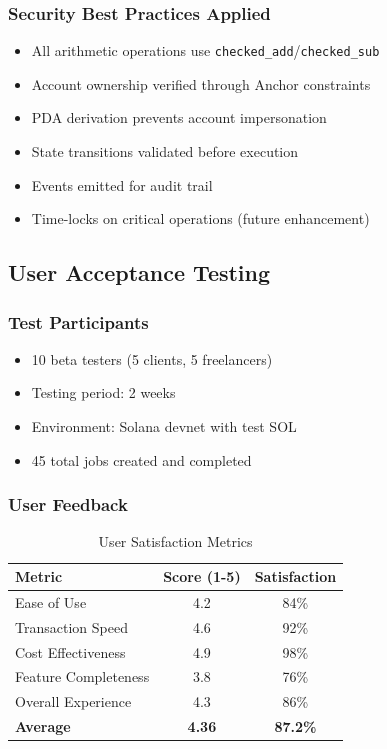 \documentclass[a4paper,13pt,twoside]{report}
\theoremstyle{definition}
\begin{document}
\subsubsection{Security Best Practices Applied}

\begin{itemize}
    \item All arithmetic operations use \texttt{checked\_add}/\texttt{checked\_sub}
    \item Account ownership verified through Anchor constraints
    \item PDA derivation prevents account impersonation
    \item State transitions validated before execution
    \item Events emitted for audit trail
    \item Time-locks on critical operations (future enhancement)
\end{itemize}

\subsection{User Acceptance Testing}

\subsubsection{Test Participants}

\begin{itemize}
    \item 10 beta testers (5 clients, 5 freelancers)
    \item Testing period: 2 weeks
    \item Environment: Solana devnet with test SOL
    \item 45 total jobs created and completed
\end{itemize}

\subsubsection{User Feedback}

\begin{table}[h]
\centering
\caption{User Satisfaction Metrics}
\begin{tabular}{|l|c|c|}
\hline
\textbf{Metric} & \textbf{Score (1-5)} & \textbf{Satisfaction} \\
\hline
Ease of Use & 4.2 & 84\% \\
Transaction Speed & 4.6 & 92\% \\
Cost Effectiveness & 4.9 & 98\% \\
Feature Completeness & 3.8 & 76\% \\
Overall Experience & 4.3 & 86\% \\
\hline
\textbf{Average} & \textbf{4.36} & \textbf{87.2\%} \\
\hline
\end{tabular}
\end{table}
\end{document}
